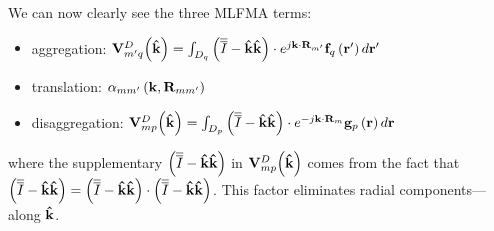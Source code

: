 We can now clearly see the three MLFMA terms:
\begin{itemize}
\item aggregation: $\mathbf{V}_{m'q}^D \! \left(\mathbf{\hat{k}}\right) = \int_{D_q} \left( \overline{\overline{I}}-\mathbf{\hat{k}}\mathbf{\hat{k}} \right) \cdot e^{j\mathbf{k} \cdot \mathbf{R}_{m'}} \mathbf{f}_q\left(\mathbf{r}'\right) d \mathbf{r}'$
\item translation: $\alpha_{mm'}\left(\mathbf{k}, \mathbf{R}_{mm'} \right)$
\item disaggregation: $\mathbf{V}_{mp}^D \! \left(\mathbf{\hat{k}}\right) = \int_{D_p} \left( \overline{\overline{I}}-\mathbf{\hat{k}}\mathbf{\hat{k}} \right) \cdot e^{-j\mathbf{k} \cdot \mathbf{R}_{m}} \mathbf{g}_p\left(\mathbf{r}\right) d \mathbf{r}$
\end{itemize}
where the supplementary $\left(\overline{\overline{I}}-\mathbf{\hat{k}}\mathbf{\hat{k}} \right)$ in $\mathbf{V}_{mp}^D \! \left(\mathbf{\hat{k}}\right)$ comes from the fact that $\left(\overline{\overline{I}}-\mathbf{\hat{k}}\mathbf{\hat{k}} \right) = \left(\overline{\overline{I}}-\mathbf{\hat{k}}\mathbf{\hat{k}} \right) \cdot \left(\overline{\overline{I}}-\mathbf{\hat{k}}\mathbf{\hat{k}} \right)$. This factor eliminates radial components---along $\mathbf{\Hat{k}}$.

